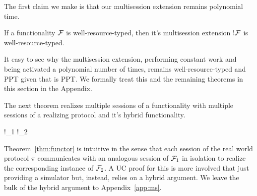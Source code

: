 %

The first claim we make is that our multisession extension remains polynomial time.
\begin{theorem}[PPT !]\label{thm:bangppt}
If a functionality $\mathcal{F}$ is well-resource-typed, then it's multisession extension $!\mathcal{F}$ is well-resource-typed.
\end{theorem}
It easy to see why the multisession extension, performing constant work and being activated a polynomial number of times, remains well-resource-typed and PPT given that \F is PPT.
We formally treat this and the remaining theorems in this section in the Appendix.

The next theorem realizes multiple sessions of a functionality with multiple sessions of a realizing protocol and it's hybrid functionality.
\begin{theorem}\label{thm:functor}
	\begin{mathpar}
		{
			!\F_1 \xrightarrow{!\pi} !\F_2
		}
	\end{mathpar}
\end{theorem}
Theorem~\ref{thm:functor} is intuitive in the sense that each session of the real world protocol $\pi$ communicates with an analogous session of $\mathcal{F}_1$ in isolation to realize the corresponding instance of $\mathcal{F}_2$. 
A UC proof for this is more involved that just providing a simulator but, instead, relies on a hybrid argument. 
We leave the bulk of the hybrid argument to Appendix~\ref{app:ms}.

